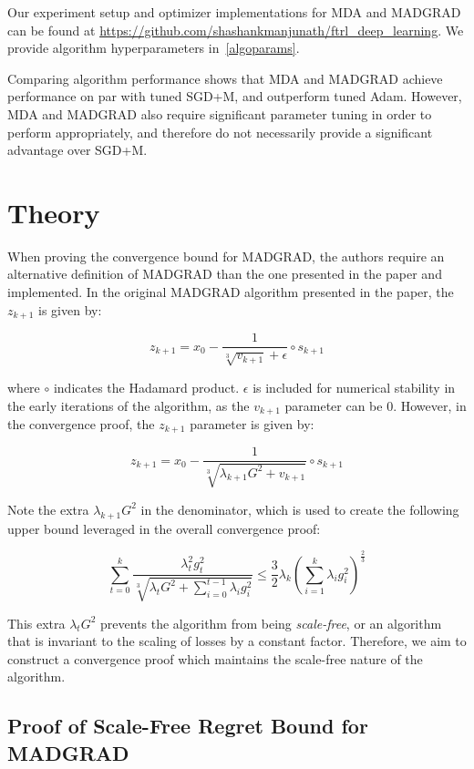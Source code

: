 \documentclass{article}
\begin{document}
Our experiment setup and optimizer implementations for MDA and MADGRAD can be found at
\url{https://github.com/shashankmanjunath/ftrl_deep_learning}. We provide algorithm hyperparameters in~\ref{algoparams}.

Comparing algorithm performance shows that MDA and MADGRAD achieve performance on par with tuned SGD+M, and outperform
tuned Adam. However, MDA and MADGRAD also require significant parameter tuning in order to perform appropriately, and
therefore do not necessarily provide a significant advantage over SGD+M.

\section{Theory}\label{section:theory}

When proving the convergence bound for MADGRAD, the authors require an alternative definition of
MADGRAD than the one presented in the paper and implemented. In the original MADGRAD algorithm presented in the paper,
the $z_{k+1}$ is given by:

\[
  z_{k+1} = x_0 - \frac{1}{\sqrt[3]{v_{k+1}} + \epsilon} \circ s_{k+1}
\]

where $\circ$ indicates the Hadamard product. $\epsilon$ is included for numerical stability in the early iterations of
the algorithm, as the $v_{k+1}$ parameter can be 0. However, in the convergence proof, the $z_{k+1}$ parameter is given
by:

\[
  z_{k+1} = x_0 - \frac{1}{\sqrt[3]{\lambda_{k+1}G^2 + v_{k+1}}} \circ s_{k+1}
\]

Note the extra $\lambda_{k+1}G^2$ in the denominator, which is used to create the following upper bound leveraged in the
overall convergence proof:

\[
  \sum\limits_{t=0}^k \frac{\lambda_t^2 g_t^2}{\sqrt[3]{\lambda_t G^2 + \sum\limits_{i=0}^{t-1} \lambda_i g_i^2}} \leq
  \frac{3}{2} \lambda_k \left(\sum\limits_{i=1}^k \lambda_i g_i^2\right)^{\frac{2}{3}}
\]

This extra $\lambda_t G^2$ prevents the algorithm from being \emph{scale-free}, or an algorithm that is invariant to the
scaling of losses by a constant factor. Therefore, we aim to construct a convergence proof which maintains the
scale-free nature of the algorithm.

\subsection{Proof of Scale-Free Regret Bound for MADGRAD}
\end{document}
